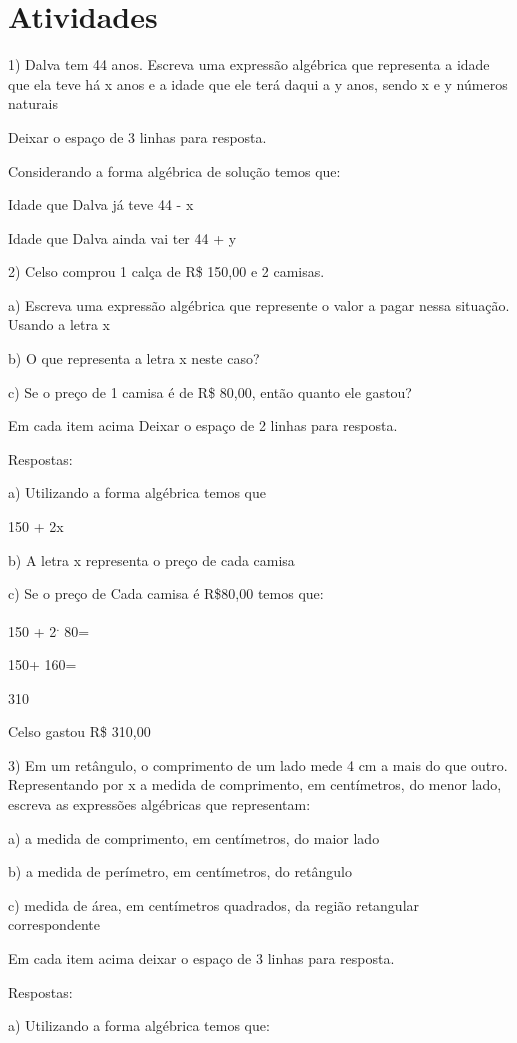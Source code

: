 \section{Atividades}

1) Dalva tem 44 anos. Escreva uma expressão algébrica que representa a
idade que ela teve há x anos e a idade que ele terá daqui a y anos,
sendo x e y números naturais

Deixar o espaço de 3 linhas para resposta.

Considerando a forma algébrica de solução temos que:

Idade que Dalva já teve 44 - x

Idade que Dalva ainda vai ter 44 + y

2) Celso comprou 1 calça de R\$ 150,00 e 2 camisas.

a) Escreva uma expressão algébrica que represente o valor a pagar nessa
situação. Usando a letra x

b) O que representa a letra x neste caso?

c) Se o preço de 1 camisa é de R\$ 80,00, então quanto ele gastou?

Em cada item acima Deixar o espaço de 2 linhas para resposta.

Respostas:

a) Utilizando a forma algébrica temos que

150 + 2x

b) A letra x representa o preço de cada camisa

c) Se o preço de Cada camisa é R\$80,00 temos que:

150 + 2\textsuperscript{.} 80=

150+ 160=

310

Celso gastou R\$ 310,00

3) Em um retângulo, o comprimento de um lado mede 4 cm a mais do que
outro. Representando por x a medida de comprimento, em centímetros, do
menor lado, escreva as expressões algébricas que representam:

a) a medida de comprimento, em centímetros, do maior lado

b) a medida de perímetro, em centímetros, do retângulo

c) medida de área, em centímetros quadrados, da região retangular
correspondente

Em cada item acima deixar o espaço de 3 linhas para resposta.

Respostas:

a) Utilizando a forma algébrica temos que:

